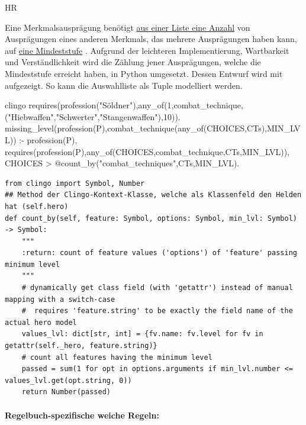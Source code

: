 \begin{enumerateWithCode}{HR}
    \item\label{itm:HR.AnyOf} Eine Merkmalsausprägung benötigt \underline{aus einer Liste eine Anzahl} von Ausprägungen eines anderen Merkmals, das mehrere Ausprägungen haben kann, auf \underline{eine Mindeststufe} .
    Aufgrund der leichteren Implementierung, Wartbarkeit und Verständlichkeit wird die Zählung jener Ausprägungen, welche die Mindeststufe erreicht haben, in Python umgesetzt.
    Dessen Entwurf wird mit  aufgezeigt.
    So kann die Auswahlliste als Tuple modelliert werden.
    \begin{mintedNameless}{clingo}
requires(profession("Söldner"),any_of(1,combat_technique,("Hiebwaffen","Schwerter","Stangenwaffen"),10)).
missing_level(profession(P),combat_technique(any_of(CHOICES,CTs),MIN_LVL)) :- profession(P), requires(profession(P),any_of(CHOICES,combat_technique,CTs,MIN_LVL)),                      CHOICES > @count_by("combat_techniques",CTs,MIN_LVL).
    \end{mintedNameless}
    \begin{listing}[ht]
        \caption{Entwurf der  Methode (Python Pseudo-Code) }\label{lst:entwurf-fulfills-any-of}
        \begin{verbatim}
from clingo import Symbol, Number
## Method der Clingo-Kontext-Klasse, welche als Klassenfeld den Helden hat (self.hero)
def count_by(self, feature: Symbol, options: Symbol, min_lvl: Symbol) -> Symbol:
    """
    :return: count of feature values ('options') of 'feature' passing minimum level
    """
    # dynamically get class field (with 'getattr') instead of manual mapping with a switch-case
    #  requires 'feature.string' to be exactly the field name of the actual hero model
    values_lvl: dict[str, int] = {fv.name: fv.level for fv in getattr(self._hero, feature.string)}
    # count all features having the minimum level
    passed = sum(1 for opt in options.arguments if min_lvl.number <= values_lvl.get(opt.string, 0))
    return Number(passed)
        \end{verbatim}
    \end{listing}
\end{enumerateWithCode}

\pagebreak %
\paragraph{Regelbuch-spezifische weiche Regeln:}\label{par:WR}


